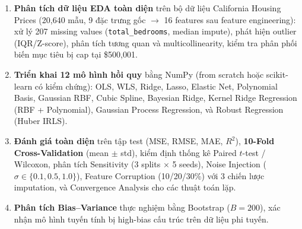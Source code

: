 \documentclass[12pt, a4paper]{article}
\begin{document}
\begin{enumerate}
  \item \textbf{Phân tích dữ liệu EDA toàn diện} trên bộ dữ liệu
        California Housing Prices (20{,}640 mẫu, 9 đặc trưng gốc $\to$
        16 features sau feature engineering):
        xử lý 207 missing values (\texttt{total\_bedrooms}, median impute),
        phát hiện outlier (IQR/Z-score), phân tích tương quan và
        multicollinearity, kiểm tra phân phối biến mục tiêu bị cap tại
        \$500{,}001.

  \item \textbf{Triển khai 12 mô hình hồi quy} bằng NumPy (from scratch
        hoặc scikit-learn có kiểm chứng):
        OLS, WLS, Ridge, Lasso, Elastic Net, Polynomial Basis,
        Gaussian RBF, Cubic Spline, Bayesian Ridge,
        Kernel Ridge Regression (RBF + Polynomial),
        Gaussian Process Regression, và Robust Regression (Huber IRLS).

  \item \textbf{Đánh giá toàn diện} trên tập test (MSE, RMSE, MAE, $R^2$),
        \textbf{10-Fold Cross-Validation} (mean $\pm$ std), kiểm định thống
        kê Paired $t$-test / Wilcoxon, phân tích Sensitivity (3 splits $\times$
        5 seeds), Noise Injection ($\sigma \in \{0.1, 0.5, 1.0\}$),
        Feature Corruption (10/20/30\%) với 3 chiến lược imputation,
        và Convergence Analysis cho các thuật toán lặp.

  \item \textbf{Phân tích Bias--Variance} thực nghiệm bằng Bootstrap
        ($B = 200$), xác nhận mô hình tuyến tính bị high-bias cấu trúc
        trên dữ liệu phi tuyến.
\end{enumerate}
\end{document}

